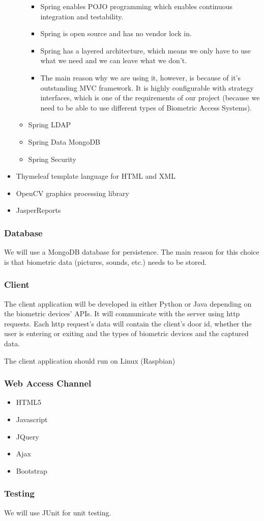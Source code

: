 \begin{itemize}
\begin{itemize}
\begin{itemize}
					\item Spring enables POJO programming which enables continuous integration and testability.
					\item Spring is open source and has no vendor lock in.
					\item Spring has a layered architecture, which means we only have to use what we need and we can leave what we don't.
					\item The main reason why we are using it, however, is because of it's outstanding MVC framework. It is highly configurable with strategy interfaces, which is one of the requirements of our project (because we need to be able to use different types of Biometric Access Systems).
				\end{itemize}
			\item Spring LDAP
			\item Spring Data MongoDB
			\item Spring Security
		\end{itemize}
	\item Thymeleaf template language for HTML and XML
	\item OpenCV graphics processing library
	\item JasperReports
\end{itemize}

\subsubsection{Database}
We will use a MongoDB database for persistence. The main reason for this choice is that biometric data (pictures, sounds, etc.) needs to be stored.

\subsubsection{Client}
The client application will be developed in either Python or Java depending on the biometric devices' APIs. It will communicate with the server using http requests. Each http request's data will contain the client's door id, whether the user is entering or exiting and the types of biometric devices and the captured data. 

The client application should run on Linux (Raspbian)

\subsubsection{Web Access Channel}
\begin{itemize}
	\item HTML5
	\item Javascript
	\item JQuery
	\item Ajax
	\item Bootstrap
\end{itemize}

\subsubsection{Testing}
We will use JUnit for unit testing.